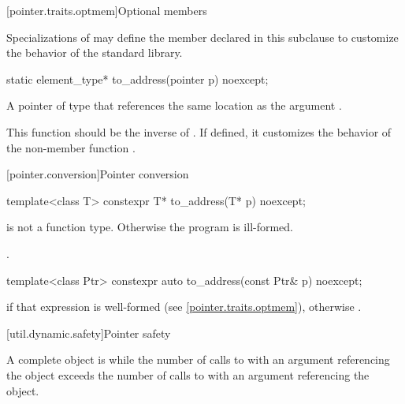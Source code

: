 [pointer.traits.optmem]{Optional members}

\pnum
Specializations of  may define the member declared
in this subclause to customize the behavior of the standard library.

%
\begin{itemdecl}
static element_type* to_address(pointer p) noexcept;
\end{itemdecl}

\begin{itemdescr}
\pnum
\returns
A pointer of type  that references
the same location as the argument .

\pnum
\begin{note}
This function should be the inverse of .
If defined, it customizes the behavior of
the non-member function
.
\end{note}
\end{itemdescr}

[pointer.conversion]{Pointer conversion}

%
\begin{itemdecl}
template<class T> constexpr T* to_address(T* p) noexcept;
\end{itemdecl}

\begin{itemdescr}
\pnum
\requires {} is not a function type. Otherwise the program is ill-formed.

\pnum
\returns
{}.
\end{itemdescr}

%
\begin{itemdecl}
template<class Ptr> constexpr auto to_address(const Ptr& p) noexcept;
\end{itemdecl}

\begin{itemdescr}
\pnum
\returns
{} if that expression is well-formed
(see \ref{pointer.traits.optmem}),
otherwise .
\end{itemdescr}

[util.dynamic.safety]{Pointer safety}

\pnum
A complete object is  while the number of calls to
 with an argument referencing the object exceeds the
number of calls to  with an argument referencing the
object.


